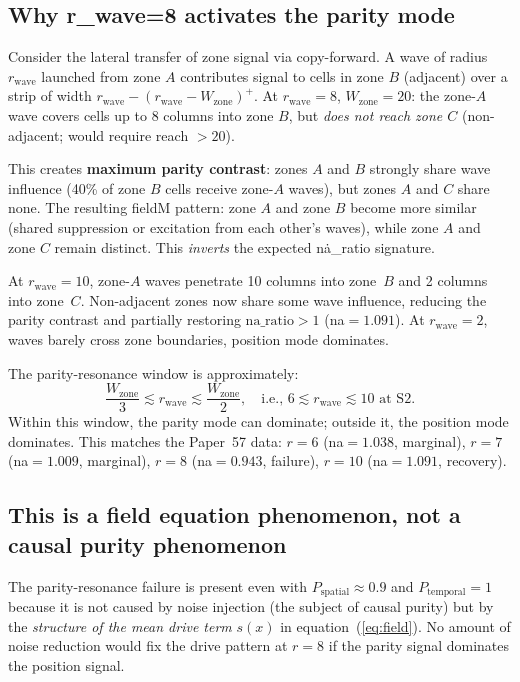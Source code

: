 \documentclass[11pt,a4paper]{article}
\newcommand{\na}{\mathrm{na\_ratio}}
\newcommand{\Psp}{P_{\mathrm{spatial}}}
\newcommand{\Ptemp}{P_{\mathrm{temporal}}}
\begin{document}
\subsection{Why r\_wave=8 activates the parity mode}

Consider the lateral transfer of zone signal via copy-forward.
A wave of radius $r_\mathrm{wave}$ launched from zone $A$ contributes signal
to cells in zone $B$ (adjacent) over a strip of width $r_\mathrm{wave} - (r_\mathrm{wave} - W_\mathrm{zone})^+$.
At $r_\mathrm{wave}=8$, $W_\mathrm{zone}=20$:
the zone-$A$ wave covers cells up to 8 columns into zone $B$, but
\emph{does not reach zone $C$} (non-adjacent; would require reach $>20$).

This creates \textbf{maximum parity contrast}: zones $A$ and $B$ strongly share
wave influence (40\% of zone $B$ cells receive zone-$A$ waves), but zones
$A$ and $C$ share none.
The resulting fieldM pattern: zone $A$ and zone $B$ become more similar
(shared suppression or excitation from each other's waves), while zone $A$
and zone $C$ remain distinct.
This \emph{inverts} the expected na\._ratio signature.

At $r_\mathrm{wave}=10$, zone-$A$ waves penetrate 10 columns into zone~$B$ and
2 columns into zone~$C$.
Non-adjacent zones now share some wave influence, reducing the parity contrast
and partially restoring $\na > 1$ (na$=1.091$).
At $r_\mathrm{wave}=2$, waves barely cross zone boundaries, position mode dominates.

The parity-resonance window is approximately:
\begin{equation}
  \frac{W_\mathrm{zone}}{3} \lesssim r_\mathrm{wave} \lesssim \frac{W_\mathrm{zone}}{2},
  \quad \text{i.e., } 6 \lesssim r_\mathrm{wave} \lesssim 10 \text{ at S2.}
\end{equation}
Within this window, the parity mode can dominate; outside it, the position mode
dominates.
This matches the Paper~57 data: $r=6$ (na$=1.038$, marginal), $r=7$ (na$=1.009$,
marginal), $r=8$ (na$=0.943$, failure), $r=10$ (na$=1.091$, recovery).

\subsection{This is a field equation phenomenon, not a causal purity phenomenon}

The parity-resonance failure is present even with $\Psp \approx 0.9$ and $\Ptemp=1$
because it is not caused by noise injection (the subject of causal purity) but by
the \emph{structure of the mean drive term} $s(x)$ in equation~(\ref{eq:field}).
No amount of noise reduction would fix the drive pattern at $r=8$ if the parity
signal dominates the position signal.
\end{document}
